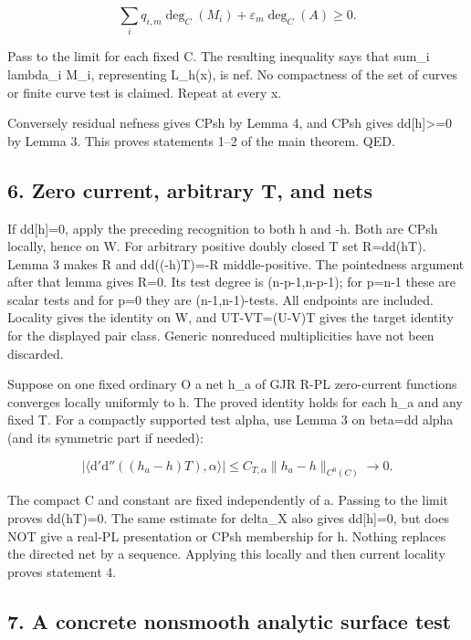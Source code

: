 \documentclass[
  11pt,
]{article}
\newcommand{\ddc}{\mathrm d'\mathrm d''}
\begin{document}
\[
\sum_i q_{i,m}\deg_C(M_i)+\varepsilon_m\deg_C(A)\ge0.
\]

Pass to the limit for each fixed C. The resulting inequality says that
sum\_i lambda\_i M\_i, representing L\_h(x), is nef. No compactness of
the set of curves or finite curve test is claimed. Repeat at every x.

Conversely residual nefness gives CPsh by Lemma 4, and CPsh gives
dd{[}h{]}\textgreater=0 by Lemma 3. This proves statements 1--2 of the
main theorem. QED.

\subsection{6. Zero current, arbitrary T, and
nets}\label{zero-current-arbitrary-t-and-nets}

If dd{[}h{]}=0, apply the preceding recognition to both h and -h. Both
are CPsh locally, hence on W. For arbitrary positive doubly closed T set
R=dd(hT). Lemma 3 makes R and dd((-h)T)=-R middle-positive. The
pointedness argument after that lemma gives R=0. Its test degree is
(n-p-1,n-p-1); for p=n-1 these are scalar tests and for p=0 they are
(n-1,n-1)-tests. All endpoints are included. Locality gives the identity
on W, and UT-VT=(U-V)T gives the target identity for the displayed pair
class. Generic nonreduced multiplicities have not been discarded.

Suppose on one fixed ordinary O a net h\_a of GJR R-PL zero-current
functions converges locally uniformly to h. The proved identity holds
for each h\_a and any fixed T. For a compactly supported test alpha, use
Lemma 3 on beta=dd alpha (and its symmetric part if needed):

\[
\bigl|\langle\ddc((h_a-h)T),\alpha\rangle\bigr|\le C_{T,\alpha}\|h_a-h\|_{C^0(C)}\longrightarrow0.
\]

The compact C and constant are fixed independently of a. Passing to the
limit proves dd(hT)=0. The same estimate for delta\_X also gives
dd{[}h{]}=0, but does NOT give a real-PL presentation or CPsh membership
for h. Nothing replaces the directed net by a sequence. Applying this
locally and then current locality proves statement 4.

\subsection{7. A concrete nonsmooth analytic surface
test}\label{a-concrete-nonsmooth-analytic-surface-test}
\end{document}
